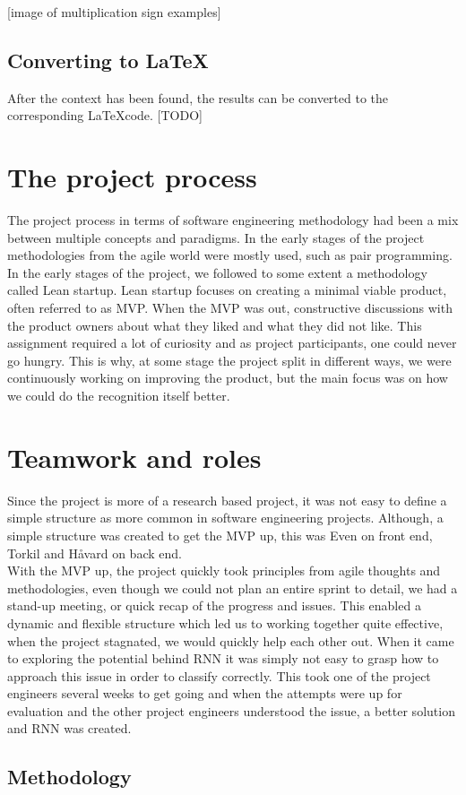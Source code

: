 [image of multiplication sign examples]


\subsection{Converting to \LaTeX}
After the context has been found, the results can be converted to the corresponding \LaTeX code. [TODO]

\section{The project process}

The project process in terms of software engineering methodology had been a mix between multiple concepts and paradigms. In the early stages of the project methodologies from the agile world were mostly used, such as pair programming. In the early stages of the project, we followed to some extent a methodology called Lean startup. Lean startup focuses on creating a minimal viable product, often referred to as \gls{MVP}. When the MVP was out, constructive discussions with the product owners about what they liked and what they did not like. This assignment required a lot of curiosity and as project participants, one could never go hungry. This is why, at some stage the project split in different ways, we were continuously working on improving the product, but the main focus was on how we could do the recognition itself better.

\section{Teamwork and roles}
Since the project is more of a research based project, it was not easy to define a simple structure as more common in software engineering projects. Although, a simple structure was created to get the MVP up, this was Even on front end, Torkil and Håvard on back end. \\ %
With the MVP up, the project quickly took principles from agile thoughts and methodologies, even though we could not plan an entire sprint to detail, we had a stand-up meeting, or quick recap of the progress and issues. This enabled a dynamic and flexible structure which led us to working together quite effective, when the project stagnated, we would quickly help each other out. When it came to exploring the potential behind RNN it was simply not easy to grasp how to approach this issue in order to classify correctly. This took one of the project engineers several weeks to get going and when the attempts were up for evaluation and the other project engineers understood the issue, a better solution and RNN was created. %

\subsection{Methodology}